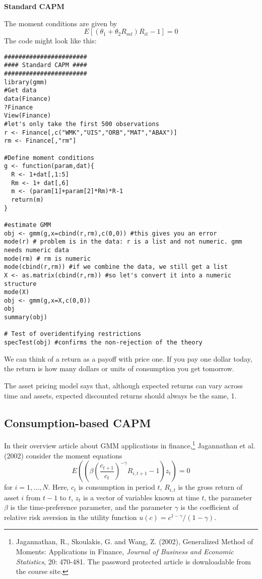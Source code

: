 \documentclass{article}
\begin{document}
\begin{solution}
\textbf{Standard CAPM }

The moment conditions are given by
\begin{equation*}
  E\left[(\theta_1+\theta_2 R_{mt})R_{it}-1\right]=0
\end{equation*}
The code might look like this:
\begin{verbatim}
#######################
#### Standard CAPM ####
#######################
library(gmm)
#Get data
data(Finance)
?Finance
View(Finance)
#let's only take the first 500 observations
r <- Finance[,c("WMK","UIS","ORB","MAT","ABAX")]
rm <- Finance[,"rm"]

#Define moment conditions
g <- function(param,dat){
  R <- 1+dat[,1:5]
  Rm <- 1+ dat[,6]
  m <- (param[1]+param[2]*Rm)*R-1
  return(m)
}

#estimate GMM
obj <- gmm(g,x=cbind(r,rm),c(0,0)) #this gives you an error
mode(r) # problem is in the data: r is a list and not numeric. gmm needs numeric data
mode(rm) # rm is numeric
mode(cbind(r,rm)) #if we combine the data, we still get a list
X <- as.matrix(cbind(r,rm)) #so let's convert it into a numeric structure
mode(X)
obj <- gmm(g,x=X,c(0,0))
obj
summary(obj)

# Test of overidentifying restrictions
specTest(obj) #confirms the non-rejection of the theory
\end{verbatim}
We can think of a return as a payoff with price one. If you pay one dollar
today, the return is how many dollars or units of consumption you get
tomorrow.

The asset pricing model says that, although expected returns can vary
across time and assets, expected discounted returns should always be the
same, 1.
\end{solution}

\subsection{Consumption-based CAPM}

In their overview article about GMM applications in finance,\footnote{%
Jagannathan, R., Skoulakis, G. and Wang, Z. (2002), Generalized Method of
Moments: Applications in Finance, \emph{Journal of Business and Economic
Statistics}, 20: 470-481. The password protected article is downloadable
from the course site.} Jagannathan et al. (2002) consider the moment
equations%
\begin{equation*}
E\left( \left( \beta \left( \frac{c_{t+1}}{c_{t}}\right) ^{-\gamma
}R_{i,t+1}-1\right) z_{t}\right) =0
\end{equation*}%
for $i=1,\ldots ,N$. Here, $c_{t}$ is consumption in period $t$, $R_{i,t}$
is the gross return of asset $i$ from $t-1$ to $t$, $z_{t}$ is a vector of
variables known at time $t$, the parameter $\beta $ is the time-preference
parameter, and the parameter $\gamma $ is the coefficient of relative risk
aversion in the utility function $u(c)=c^{1-\gamma }/(1-\gamma )$.
\end{document}
